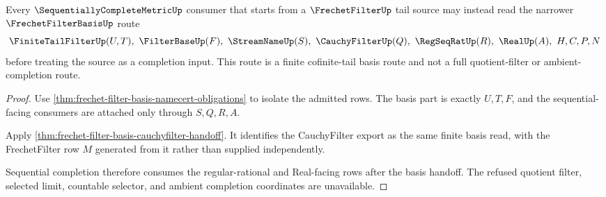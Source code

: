 \begin{theorem}
\label{thm:frechet-filter-sequential-completion-tail-basis-route}
Every $\SequentiallyCompleteMetricUp$ consumer that starts from a $\FrechetFilterUp$ tail source may instead read the narrower $\FrechetFilterBasisUp$ route
$$
\FiniteTailFilterUp(U,T),\ \FilterBaseUp(F),\ \StreamNameUp(S),\ \CauchyFilterUp(Q),\ \RegSeqRatUp(R),\ \RealUp(A),\ H,C,P,N
$$
before treating the source as a completion input. This route is a finite cofinite-tail basis route and not a full quotient-filter or ambient-completion route.
\end{theorem}
\begin{proof}
Use \autoref{thm:frechet-filter-basis-namecert-obligations} to isolate the admitted rows. The basis part is exactly $U,T,F$, and the sequential-facing consumers are attached only through $S,Q,R,A$.

Apply \autoref{thm:frechet-filter-basis-cauchyfilter-handoff}. It identifies the CauchyFilter export as the same finite basis read, with the FrechetFilter row $M$ generated from it rather than supplied independently.

Sequential completion therefore consumes the regular-rational and Real-facing rows after the basis handoff. The refused quotient filter, selected limit, countable selector, and ambient completion coordinates are unavailable.
\end{proof}


\begin{closurestatus}{\FrechetFilterBasisUp}
  \theoryclosure{\seedClosure}
  \formalstatus{\unformalizedV}
\end{closurestatus}
